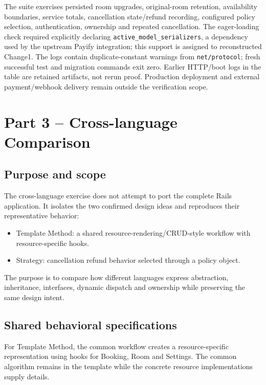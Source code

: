 \documentclass[10pt,a4paper]{article}
\newcommand{\code}[1]{\texttt{\small #1}}
\begin{document}
The suite exercises persisted room upgrades, original-room retention, availability boundaries, service totals, cancellation state/refund recording, configured policy selection, authentication, ownership and repeated cancellation. The eager-loading check required explicitly declaring \code{active\_model\_serializers}, a dependency used by the upstream Payify integration; this support is assigned to reconstructed Change1. The logs contain duplicate-constant warnings from \code{net/protocol}; fresh successful test and migration commands exit zero. Earlier HTTP/boot logs in the table are retained artifacts, not rerun proof. Production deployment and external payment/webhook delivery remain outside the verification scope.

\section{Part 3 -- Cross-language Comparison}

\subsection{Purpose and scope}

The cross-language exercise does not attempt to port the complete Rails application. It isolates the two confirmed design ideas and reproduces their representative behavior:

\begin{itemize}[leftmargin=*]
\item Template Method: a shared resource-rendering/CRUD-style workflow with resource-specific hooks.
\item Strategy: cancellation refund behavior selected through a policy object.
\end{itemize}

The purpose is to compare how different languages express abstraction, inheritance, interfaces, dynamic dispatch and ownership while preserving the same design intent.

\subsection{Shared behavioral specifications}

For Template Method, the common workflow creates a resource-specific representation using hooks for Booking, Room and Settings. The common algorithm remains in the template while the concrete resource implementations supply details.
\end{document}

